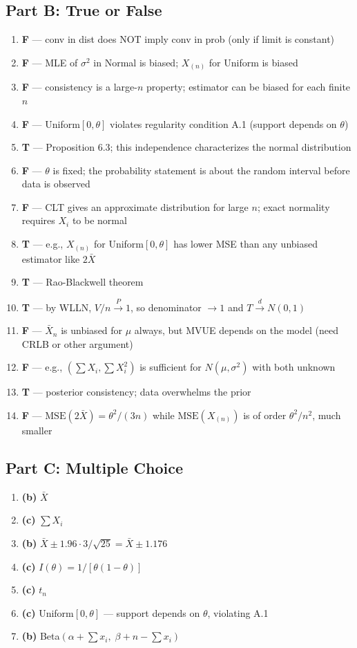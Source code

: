 \documentclass[11pt]{article}
\begin{document}
\subsection*{Part B: True or False}
\begin{enumerate}[start=11]
\item \textbf{F} --- conv in dist does NOT imply conv in prob (only if limit is constant)
\item \textbf{F} --- MLE of $\sigma^2$ in Normal is biased; $X_{(n)}$ for Uniform is biased
\item \textbf{F} --- consistency is a large-$n$ property; estimator can be biased for each finite $n$
\item \textbf{F} --- Uniform$[0,\theta]$ violates regularity condition A.1 (support depends on $\theta$)
\item \textbf{T} --- Proposition 6.3; this independence characterizes the normal distribution
\item \textbf{F} --- $\theta$ is fixed; the probability statement is about the random interval before data is observed
\item \textbf{F} --- CLT gives an approximate distribution for large $n$; exact normality requires $X_i$ to be normal
\item \textbf{T} --- e.g., $X_{(n)}$ for Uniform$[0,\theta]$ has lower MSE than any unbiased estimator like $2\bar X$
\item \textbf{T} --- Rao-Blackwell theorem
\item \textbf{T} --- by WLLN, $V/n \xrightarrow{P} 1$, so denominator $\to 1$ and $T \xrightarrow{d} N(0,1)$
\item \textbf{F} --- $\bar X_n$ is unbiased for $\mu$ always, but MVUE depends on the model (need CRLB or other argument)
\item \textbf{F} --- e.g., $(\sum X_i, \sum X_i^2)$ is sufficient for $N(\mu,\sigma^2)$ with both unknown
\item \textbf{T} --- posterior consistency; data overwhelms the prior
\item \textbf{F} --- $\text{MSE}(2\bar X) = \theta^2/(3n)$ while $\text{MSE}(X_{(n)})$ is of order $\theta^2/n^2$, much smaller
\end{enumerate}

\subsection*{Part C: Multiple Choice}
\begin{enumerate}[start=25]
\item \textbf{(b)} $\bar X$
\item \textbf{(c)} $\sum X_i$
\item \textbf{(b)} $\bar X \pm 1.96 \cdot 3/\sqrt{25} = \bar X \pm 1.176$
\item \textbf{(c)} $I(\theta) = 1/[\theta(1-\theta)]$
\item \textbf{(c)} $t_n$
\item \textbf{(c)} Uniform$[0,\theta]$ --- support depends on $\theta$, violating A.1
\item \textbf{(b)} Beta$(\alpha + \sum x_i, \;\beta + n - \sum x_i)$
\end{enumerate}
\end{document}
